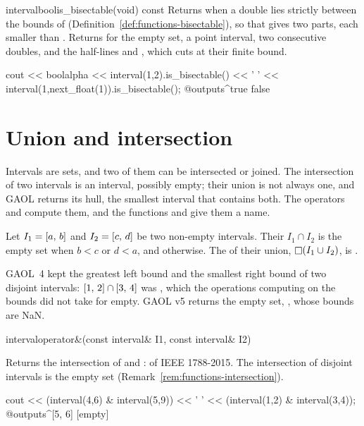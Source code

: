 \begin{defmethod}{interval}{bool}{is\_bisectable}{(void) const}
  Returns  when a double lies strictly between the bounds of
   (Definition~\ref{def:functions-bisectable}), so that
   gives two parts, each smaller than . Returns
   for the empty set, a point interval, two consecutive
  doubles, and the half-lines  and
  , which  cuts at their finite
  bound.\newinvfive
  \begin{example}
cout << boolalpha << interval(1,2).is_bisectable() << ' '
     << interval(1,next_float(1)).is_bisectable();
@outputs^true false~
  \end{example}
\end{defmethod}

\section{Union and intersection}\label{sec:functions-union}
%

Intervals are sets, and two of them can be intersected or joined. The
intersection of two intervals is an interval, possibly empty; their union
is not always one, and GAOL returns its hull, the smallest interval that
contains both. The operators \code{\&} and \code{|} compute them, and the
functions  and  give them a name.

\begin{Def}\label{def:functions-hull}
Let $I_1=[a,\,b]$ and $I_2=[c,\,d]$ be two non-empty intervals. Their
 $I_1\cap I_2$ is the empty set when $b<c$ or $d<a$, and
 otherwise. The  of their union,
$\mathop{\Box} (I_1\cup I_2)$, is .
\end{Def}

\begin{Rem}\label{rem:functions-intersection}
GAOL~4 kept the greatest left bound and the smallest right bound of two
disjoint intervals: $[1,\,2]\cap[3,\,4]$ was , which the
operations computing on the bounds did not take for empty. GAOL v5 returns
the empty set, , whose bounds are
NaN.\newinvfive
\end{Rem}

\begin{deffun}{interval}{operator\&}{(const interval\& I1, const interval\& I2)}
  \begin{operation}
  \end{operation}
  Returns the intersection of  and :  of
  IEEE 1788-2015. The intersection of disjoint intervals is the empty set
   (Remark~\ref{rem:functions-intersection}).
  \begin{example}
cout << (interval(4,6) & interval(5,9)) << ' '
     << (interval(1,2) & interval(3,4));
@outputs^[5, 6] [empty]~
  \end{example}
\end{deffun}

